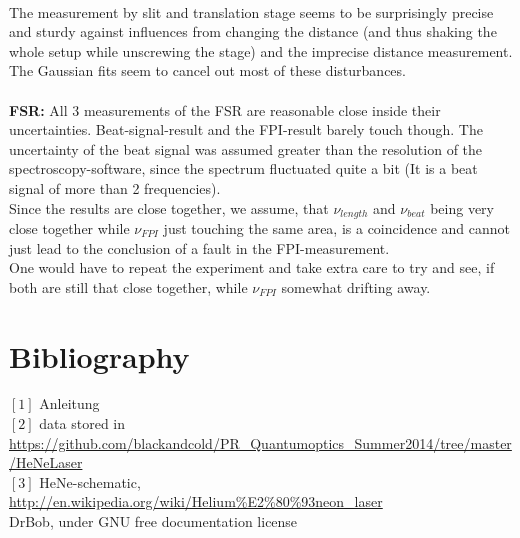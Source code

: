 \documentclass[12pt,a4paper]{article}
\begin{document}
\begin{multicols}{2}
\\
The measurement by slit and translation stage seems to be surprisingly precise and sturdy against influences from changing the distance (and thus shaking the whole setup while unscrewing the stage) and the imprecise distance measurement. The Gaussian fits seem to cancel out most of these disturbances.\\
\\
\textbf{FSR:}
All 3 measurements of the FSR are reasonable close inside their uncertainties. Beat-signal-result and the FPI-result barely touch though. The uncertainty of the beat signal was assumed greater than the resolution of the spectroscopy-software, since the spectrum fluctuated quite a bit (It is a beat signal of more than 2 frequencies).\\
Since the results are close together, we assume, that $\nu_{length}$ and $\nu_{beat}$ being very close together while $\nu_{FPI}$ just touching the same area, is a coincidence and cannot just lead to the conclusion of a fault in the FPI-measurement.\\
One would have to repeat the experiment and take extra care to try and see, if both are still that close together, while $\nu_{FPI}$ somewhat drifting away.


%
%
\section{Bibliography}
$[1]$ Anleitung\\
$[2]$ data stored in \url{https://github.com/blackandcold/PR_Quantumoptics_Summer2014/tree/master/HeNeLaser}\\
$[3]$ %
HeNe-schematic, \url{http://en.wikipedia.org/wiki/Helium\%E2\%80\%93neon_laser}\\
DrBob, under GNU free documentation license


\end{multicols}
\end{document}
